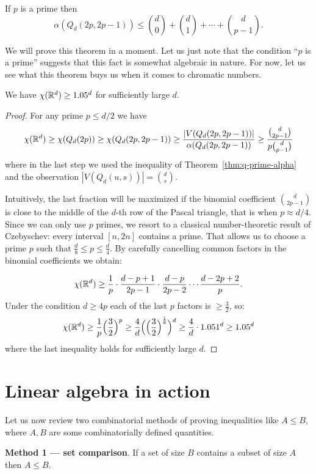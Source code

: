 \begin{theorem}
\label{thm:q-prime-alpha}
If $p$ is a prime then 
$$\alpha(Q_d(2p,2p-1))\leq {d\choose 0}+{d\choose 1}+\cdots+{d\choose p-1}.$$
\end{theorem}

We will prove this theorem in a moment. Let us just note that the condition ``$p$ is a prime'' suggests that this fact is somewhat algebraic in nature. For now, let us see what this theorem buys us when it comes to chromatic numbers.

\begin{theorem}
We have $\chi(\mathbb{R}^d)\geq 1.05^d$ for sufficiently large $d$.
\end{theorem}
\begin{proof}
For any prime $p\leq d/2$ we have
$$\chi(\mathbb{R}^d)\geq\chi(Q_d(2p))\geq\chi(Q_d(2p,2p-1))\geq
\frac{|V(Q_d(2p,2p-1))|}{\alpha(Q_d(2p,2p-1))}\geq \frac{{d\choose 2p-1}}{p{d\choose p-1}}$$
where in the last step we used the inequality of Theorem~\ref{thm:q-prime-alpha} and the observation $|V(Q_d(u,s))|={d\choose s}$.

Intuitively, the last fraction will be maximized if the binomial coefficient ${d\choose 2p-1}$ is close to the middle of the $d$-th row of the Pascal triangle, that is when $p\approx d/4$. Since we can only use $p$ primes, we resort to a classical number-theoretic result of Czebyschev: every interval $[n,2n]$ contains a prime. That allows us to choose a prime $p$ such that $\frac{d}{8}\leq p\leq \frac{d}{4}$. By carefully cancelling common factors in the binomial coefficients we obtain:

$$\chi(\mathbb{R}^d)\geq \frac{1}{p}\cdot\frac{d-p+1}{2p-1}\cdot\frac{d-p}{2p-2}\cdots\frac{d-2p+2}{p}.$$
Under the condition $d\geq 4p$ each of the last $p$ factors is $\geq \frac{3}{2}$, so:
$$\chi(\mathbb{R}^d)\geq\frac{1}{p}\Big(\frac{3}{2}\Big)^p\geq\frac{4}{d}\Big(\Big(\frac{3}{2}\Big)^{\frac{1}{8}}\Big)^d\geq \frac{4}{d}\cdot 1.051^d\geq 1.05^d$$
where the last inequality holds for sufficiently large $d$.
\end{proof}

\section{Linear algebra in action}
Let us now review two combinatorial methods of proving inequalities like $A\leq B$, where $A, B$ are some combinatorially defined quantities.

\smallskip
\noindent
\textbf{Method 1 --- set comparison}. If a set of size $B$ contains a subset of size $A$ then $A\leq B$.

